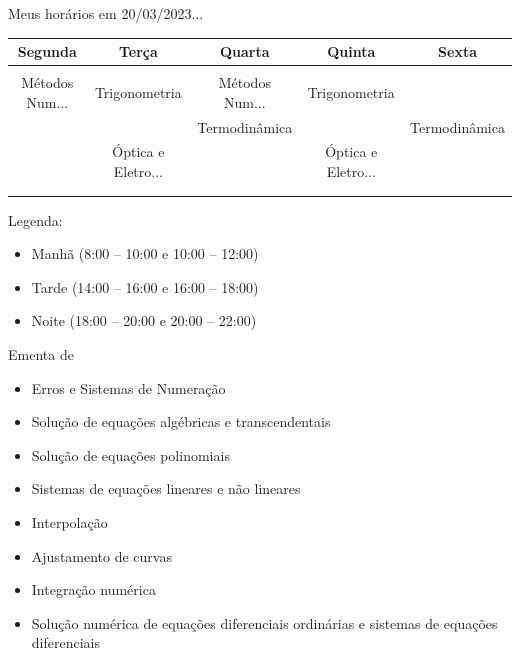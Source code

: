 \begin{frame}{Meus horários em 20/03/2023...}
    \small{
        \begin{center}
            \begin{tabular}{ccccc}
                \rowcolor{black!10} Segunda & Terça & Quarta & Quinta & Sexta \\ \hline
                \rowcolor{red!25} &&&& \\ \hline
                \rowcolor{red!25} Métodos Num... & Trigonometria & Métodos Num... & Trigonometria & \\ \hline
                \rowcolor{green!25} & & Termodinâmica & & Termodinâmica \\ \hline
                \rowcolor{green!25} & Óptica e Eletro... & & Óptica e Eletro... & \\ \hline
                \rowcolor{blue!25} &&&& \\ \hline
                \rowcolor{blue!25} &&&& \\ \hline
            \end{tabular}
        \end{center}

        \vspace{1cm}
        Legenda:
        \begin{itemize}
            \item[\textcolor{red!25}{\rule{1em}{1em}}] Manhã (8:00 -- 10:00 e 10:00 -- 12:00)
            \item[\textcolor{green!25}{\rule{1em}{1em}}] Tarde (14:00 -- 16:00 e 16:00 -- 18:00)
            \item[\textcolor{blue!25}{\rule{1em}{1em}}] Noite (18:00 -- 20:00 e 20:00 -- 22:00)
        \end{itemize}
    }
\end{frame}

\begin{frame}{Ementa de \Disciplina}
    \begin{itemize}
        \item Erros e Sistemas de Numeração
        \item Solução de equações algébricas e transcendentais
        \item Solução de equações polinomiais
        \item Sistemas de equações lineares e não lineares
        \item Interpolação
        \item Ajustamento de curvas
        \item Integração numérica
        \item Solução numérica de equações diferenciais ordinárias e
            sistemas de equações diferenciais
    \end{itemize}
\end{frame}

